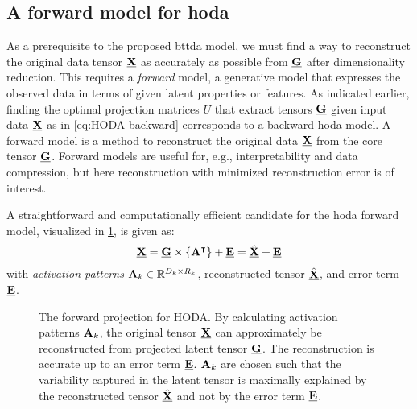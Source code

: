 \documentclass[twocolumn]{article}
\begin{document}
\subsection{A forward model for \acs{hoda}}

As a prerequisite to the proposed \ac{bttda} model, we must find a
way to reconstruct the original data tensor $\underline{\mathbf{X}}$ as accurately as possible
from $\underline{\mathbf{G}}$ after dimensionality reduction.
This requires a \emph{forward} model, a generative model that expresses the observed data in
terms of given latent properties or features.
As indicated earlier, finding the optimal projection matrices ${U}$ that extract
tensors $\underline{\mathbf{G}}$ given input data $\underline{\mathbf{X}}$ as in \cref{eq:HODA-backward}
corresponds to a backward \ac{hoda} model.
A forward model is a method to reconstruct the original data $\underline{\mathbf{X}}$
from the core tensor $\underline{\mathbf{G}}$.
Forward models are useful for, e.g., interpretability and data compression,
but here reconstruction with minimized reconstruction error is of interest.

A straightforward and computationally efficient candidate for the \ac{hoda}
forward model, visualized in \cref{fig:hoda-forward}, is given as:
\begin{equation}
	\underline{\mathbf{X}} = \underline{\mathbf{G}}\times\left\{\mathbf{A}^\intercal\right\} + \underline{\mathbf{E}} =
	\hat{\underline{\mathbf{X}}} + \underline{\mathbf{E}}
	\label{eq:HODA-forward}
\end{equation}
with \emph{activation patterns} $\mathbf{A}_k \in \mathbb{R}^{D_k\times R_k}$,
reconstructed tensor $\hat{\underline{\mathbf{X}}}$, and error term $\underline{\mathbf{E}}$.
\begin{figure*}[t]
	\centering
	
	\caption[A forward projection for \ac{hoda}.]{The forward projection for HODA.
		By calculating activation patterns $\mathbf{A}_k$, the original tensor $\underline{\mathbf{X}}$ can approximately be
		reconstructed from projected latent tensor $\underline{\mathbf{G}}$.
		The reconstruction is accurate up to an error term $\underline{\mathbf{E}}$.
		$\mathbf{A}_k$ are chosen such that the variability captured in the latent tensor is
		maximally explained by the reconstructed tensor $\hat{\underline{\mathbf{X}}}$ and not by
		the error term $\underline{\mathbf{E}}$.}
	\label{fig:hoda-forward}
\end{figure*}
\end{document}
